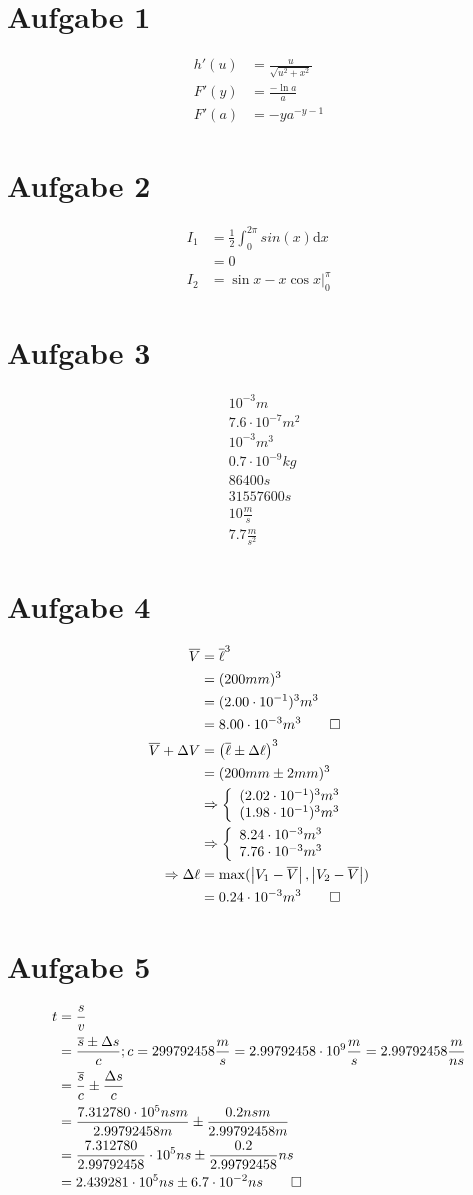 \documentclass[12pt,a4paper,notitlepage]{article}
\title{}
\newcommand{\diff}{\mathrm{d}}
\newcommand{\aufgabe}[1]{\section*{\setcounter{section}{#1}Aufgabe #1}}
\numberwithin{equation}{section}
\begin{document}
\aufgabe{1}
\begin{align}
h'(u)&=\frac{u}{\sqrt{u^2+x^2}}\\
F'(y)&=\frac{-\ln a}{a}\\
F'(a)&=-ya^{-y-1}
\end{align}
\aufgabe{2}
\begin{align}
I_1&=\frac{1}{2}\int_0^{2\pi}sin(x)\diff x\\
&=0\\
I_2&=\left.\sin x-x\cos x\right|_0^\pi
\end{align}
\aufgabe{3}
\begin{align}
&10^{-3}m\\
&7.6\cdot10^{-7}m^2\\
&10^{-3}m^3\\
&0.7\cdot 10^{-9}kg\\
&86400s\\
&31557600s\\
&10\frac{m}{s}\\
&7.7\frac{m}{s^2}
\end{align}
\aufgabe{4}
\begin{align}
\overline V&=\overline \ell^3\\
&=(200mm)^3\\
&=(2.00\cdot10^{-1})^3m^3\\
&=8.00\cdot10^{-3}m^3\qed\\
\overline V+\Delta V&=\left(\overline\ell\pm\Delta\ell\right)^3\\
&=(200mm\pm2mm)^3\\
&\Rightarrow\left\{\begin{array}{l}(2.02\cdot10^{-1})^3m^3\\(1.98\cdot10^{-1})^3m^3\\\end{array}\right.\\
&\Rightarrow\left\{\begin{array}{l}8.24\cdot10^{-3}m^3\\7.76\cdot10^{-3}m^3\\\end{array}\right.\\
\Rightarrow\Delta\ell&=\max(\left|V_1-\overline V\right|,\left|V_2-\overline V\right|)\\
&=0.24\cdot10^{-3}m^3\qed
\end{align}
\aufgabe{5}
\begin{align}
t&=\frac{s}{v}\\
&=\frac{\overline s\pm\Delta s}{c}; c=299792458\frac{m}{s}=2.99792458\cdot10^9\frac{m}{s}=2.99792458\frac{m}{ns}\\
&=\frac{\overline s}{c}\pm\frac{\Delta s}{c}\\
&=\frac{7.312780\cdot10^5nsm}{2.99792458m}\pm\frac{0.2nsm}{2.99792458m}\\
&=\frac{7.312780}{2.99792458}\cdot10^5ns\pm\frac{0.2}{2.99792458}ns\\
&=2.439281\cdot10^5ns\pm6.7\cdot10^{-2}ns\qed
\end{align}
\end{document}
